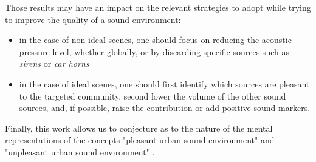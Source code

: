\documentclass[12pt]{elsarticle}
\newcommand{\ie}{\emph{i.\,e.}}
\begin{document}


Those results may have an impact on the relevant strategies to adopt while trying to improve the quality of a sound environment:


\begin{itemize}
\item in the case of non-ideal scenes, one should focus on reducing the acoustic pressure level, whether globally, or by discarding specific sources such as \emph{sirens} or \emph{car horns}
\item in the case of ideal scenes, one should first identify which sources are pleasant to the targeted community, second lower the volume of the other sound sources, and, if possible, raise the contribution or add positive sound markers.
\end{itemize}



Finally, this work allows us to conjecture as to the nature of the mental representations of the concepts "pleasant urban sound environment" and "unpleasant urban sound environment" .
\end{document}
